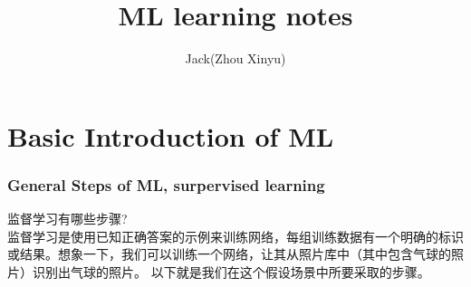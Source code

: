\documentclass{article}
\author{Jack(Zhou Xinyu)}
\title{ML learning notes}
\begin{document}
\maketitle  

\newpage
\section{Basic Introduction of ML}
  \subsubsection{General Steps of ML, surpervised learning}
  监督学习有哪些步骤?\\
  监督学习是使用已知正确答案的示例来训练网络，每组训练数据有一个明确的标识或结果。想象一下，我们可以训练一个网络，让其从照片库中（其中包含气球的照片）识别出气球的照片。
  以下就是我们在这个假设场景中所要采取的步骤。\\
\end{document}
